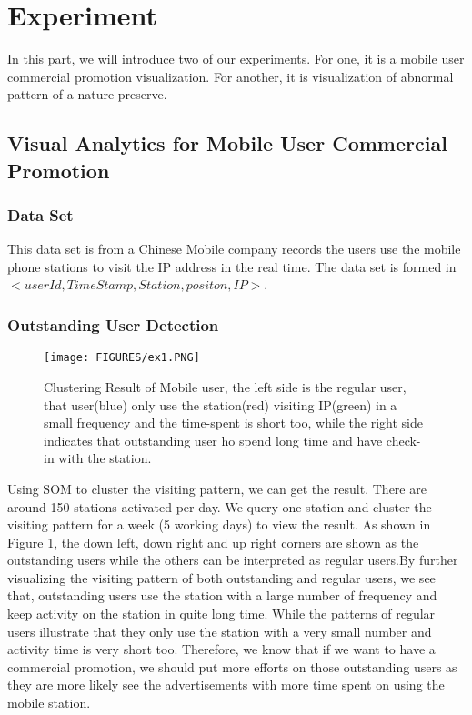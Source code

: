 \documentclass[runningheads,a4paper]{llncs}
\begin{document}
\section{Experiment}
In this part, we will introduce two of our experiments. For one, it is a mobile user commercial promotion visualization. For another, it is visualization of abnormal pattern of a nature preserve.

\subsection{Visual Analytics for Mobile User Commercial Promotion}
\subsubsection{Data Set}
This data set is from a Chinese Mobile company records the users use the mobile phone stations to visit the IP address in the real time. The data set is formed in $<userId, TimeStamp, Station, positon, IP>$. 



\subsubsection{Outstanding User Detection} 
\begin{figure}[!h]	
	\centering
    \texttt{[image: FIGURES/ex1.PNG]}
    \caption{Clustering Result of Mobile user, the left side is the regular user, that user(blue) only use the station(red) visiting IP(green) in a small frequency and the time-spent is short too, while the right side indicates that outstanding user ho spend long time and have check-in with the station.}
	\label{fig:ex1}
\end{figure}
Using SOM to cluster the visiting pattern, we can get the result. There are around 150 stations activated per day. We query one station and cluster the visiting pattern for a week  (5 working days) to view the result. As shown in Figure \ref{fig:ex1}, the down left, down right and up right corners are shown as the outstanding users while the others can be interpreted as regular users.By further visualizing the visiting pattern of both outstanding and regular users, we see that, outstanding users use the station with a large number of frequency and keep activity on the station in quite long time. While the patterns of regular users illustrate that they only use the station with a very small number and activity time is very short too. Therefore, we know that if we want to have a commercial promotion, we should put more efforts on those outstanding users as they are more likely see the advertisements with more time spent on using the mobile station.
\end{document}

